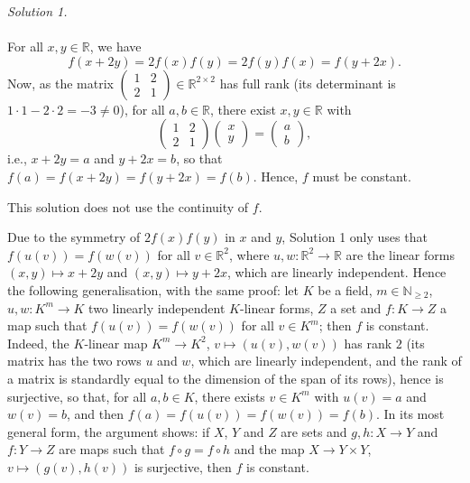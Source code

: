 \begin{solution}
    \textit{Solution 1.}
    \\\\
    For all \( x, y \in \mathbb{R} \), we have
    \[
        f\left(x+2y\right) = 2f\left(x\right)f\left(y\right) = 2f\left(y\right)f\left(x\right) = f\left(y+2x\right).
    \]
    Now, as the matrix \( \begin{pmatrix} 1 & 2 \\ 2 & 1 \end{pmatrix} \in \mathbb{R}^{2 \times 2} \) has full rank (its determinant is \( 1 \cdot 1-2 \cdot 2 = -3 \neq 0 \)), for all \( a, b \in \mathbb{R} \), there exist \( x, y \in \mathbb{R} \) with
    \[
        \begin{pmatrix} 1 & 2 \\ 2 & 1 \end{pmatrix}\begin{pmatrix} x \\ y \end{pmatrix} =
        \begin{pmatrix} a \\ b \end{pmatrix},
    \]
    i.e., \( x+2y = a \) and \( y+2x = b \), so that \( f\left(a\right) = f\left(x+2y\right) = f\left(y+2x\right) = f\left(b\right) \). Hence, \( f \) must be constant.
    \begin{remark}
        This solution does not use the continuity of \( f \).
    \end{remark}
    \begin{remark}
        Due to the symmetry of \( 2f\left(x\right)f\left(y\right) \) in \( x \) and \( y \), Solution 1 only uses that \( f\left(u\left(v\right)\right) = f\left(w\left(v\right)\right) \) for all \( v \in \mathbb{R}^2 \), where \( u, w \colon \mathbb{R}^2 \to \mathbb{R} \) are the linear forms \( \left(x, y\right) \mapsto x+2y \) and \( \left(x, y\right) \mapsto y+2x \), which are linearly independent. Hence the following generalisation, with the same proof: let \( K \) be a field, \( m \in \mathbb{N}_{\geq 2} \), \( u, w \colon K^m \to K \) two linearly independent \( K \)-linear forms, \( Z \) a set and \( f \colon K \to Z \) a map such that \( f\left(u\left(v\right)\right) = f\left(w\left(v\right)\right) \) for all \( v \in K^m \); then \( f \) is constant. Indeed, the \( K \)-linear map \( K^m \to K^2 \), \( v \mapsto \left(u\left(v\right), w\left(v\right)\right) \) has rank \( 2 \) (its matrix has the two rows \( u \) and \( w \), which are linearly independent, and the rank of a matrix is standardly equal to the dimension of the span of its rows), hence is surjective, so that, for all \( a, b \in K \), there exists \( v \in K^m \) with \( u\left(v\right) = a \) and \( w\left(v\right) = b \), and then \( f\left(a\right) = f\left(u\left(v\right)\right) = f\left(w\left(v\right)\right) = f\left(b\right) \). In its most general form, the argument shows: if \( X \), \( Y \) and \( Z \) are sets and \( g, h \colon X \to Y \) and \( f \colon Y \to Z \) are maps such that \( f \circ g = f \circ h \) and the map \( X \to Y \times Y \), \( v \mapsto \left(g\left(v\right), h\left(v\right)\right) \) is surjective, then \( f \) is constant.

\end{remark}
\end{solution}
